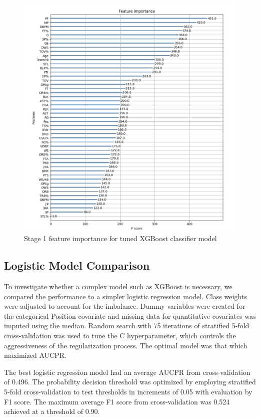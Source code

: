 \documentclass[letterpaper,titlepage]{article}
\begin{document}
    \begin{figure}[H]
        \centering
        \includegraphics[scale=0.27]{Stage_1_Feature_Importance.jpg}
        \caption{Stage 1 feature importance for tuned XGBoost classifier model}
        \label{fig:Stage1FeatImp}
    \end{figure}    

    \subsection{Logistic Model Comparison}
    To investigate whether a complex model such as XGBoost is necessary, we compared the performance to a simpler logistic regression model. Class weights were adjusted to account for the imbalance. Dummy variables were created for the categorical Position covariate and missing data for quantitative covariates was imputed using the median. Random search with 75 iterations of stratified 5-fold cross-validation was used to tune the C hyperparameter, which controls the aggressiveness of the regularization process. The optimal model was that which maximized AUCPR.

    The best logistic regression model had an average AUCPR from cross-validation of 0.496. The probability decision threshold was optimized by employing stratified 5-fold cross-validation to test thresholds in increments of 0.05 with evaluation by F1 score. The maximum average F1 score from cross-validation was 0.524 achieved at a threshold of 0.90.
\end{document}
